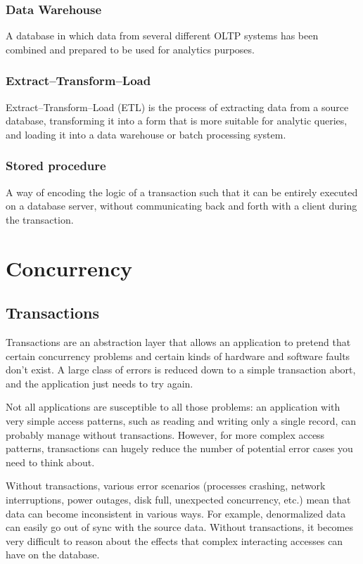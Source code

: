 \documentclass{article}
\begin{document}
    \subsubsection{Data Warehouse}
    A database in which data from several different OLTP systems has been combined and prepared to be used for analytics purposes.
    
    \subsubsection{Extract–Transform–Load}
    Extract–Transform–Load (ETL) is the process of extracting data from a source database, transforming it into a form that is more suitable for analytic queries, and loading it into a data warehouse or batch processing system.
    
    \subsubsection{Stored procedure}
    A way of encoding the logic of a transaction such that it can be entirely executed  on a database server, without communicating back and forth with a client during the transaction.
    
\section{Concurrency}
    \subsection{Transactions}
    Transactions are an abstraction layer that allows an application to pretend that certain concurrency problems and certain kinds of hardware and software faults don’t exist. A large class of errors is reduced down to a simple transaction abort, and the application just needs to try again.
    
    Not all applications are susceptible to all those problems: an application with very simple access patterns, such as reading and writing only a single record, can probably manage without transactions. However, for more complex access patterns, transactions can hugely reduce the number of potential error cases you need to think about.
    
    Without transactions, various error scenarios (processes crashing, network interruptions, power outages, disk full, unexpected concurrency, etc.) mean that data can become inconsistent in various ways. For example, denormalized data can easily go out of sync with the source data. Without transactions, it becomes very difficult to reason about the effects that complex interacting accesses can have on the database.
    
\end{document}
